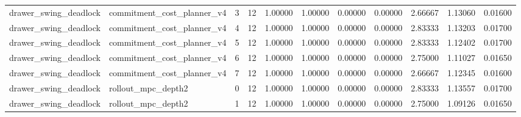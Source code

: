 \documentclass{article}
\begin{document}
\begin{table}[tbp]
{\begin{tabular}{lllllllllll}
drawer\_swing\_deadlock & commitment\_cost\_planner\_v4 & 3 & 12 & 1.00000 & 1.00000 & 0.00000 & 0.00000 & 2.66667 & 1.13060 & 0.01600 \\
drawer\_swing\_deadlock & commitment\_cost\_planner\_v4 & 4 & 12 & 1.00000 & 1.00000 & 0.00000 & 0.00000 & 2.83333 & 1.13203 & 0.01700 \\
drawer\_swing\_deadlock & commitment\_cost\_planner\_v4 & 5 & 12 & 1.00000 & 1.00000 & 0.00000 & 0.00000 & 2.83333 & 1.12402 & 0.01700 \\
drawer\_swing\_deadlock & commitment\_cost\_planner\_v4 & 6 & 12 & 1.00000 & 1.00000 & 0.00000 & 0.00000 & 2.75000 & 1.11027 & 0.01650 \\
drawer\_swing\_deadlock & commitment\_cost\_planner\_v4 & 7 & 12 & 1.00000 & 1.00000 & 0.00000 & 0.00000 & 2.66667 & 1.12345 & 0.01600 \\
drawer\_swing\_deadlock & rollout\_mpc\_depth2 & 0 & 12 & 1.00000 & 1.00000 & 0.00000 & 0.00000 & 2.83333 & 1.13557 & 0.01700 \\
drawer\_swing\_deadlock & rollout\_mpc\_depth2 & 1 & 12 & 1.00000 & 1.00000 & 0.00000 & 0.00000 & 2.75000 & 1.09126 & 0.01650 \\
\bottomrule
\end{tabular}
}
\end{table}

\clearpage
\end{document}
